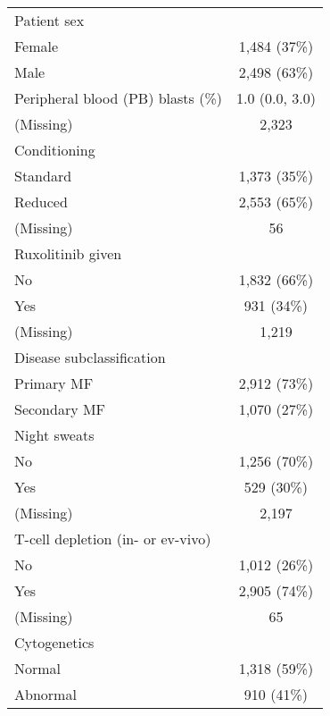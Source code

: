 \documentclass[
  12pt,
  a4paper,
]{article}
\begin{document}
\begin{longtable}[t]{lc}
Patient sex & \\
\hspace{1em}Female & 1,484 (37\%)\\
\hspace{1em}Male & 2,498 (63\%)\\
Peripheral blood (PB) blasts (\%) & 1.0 (0.0, 3.0)\\
\hspace{1em}(Missing) & 2,323\\
Conditioning & \\
\hspace{1em}Standard & 1,373 (35\%)\\
\hspace{1em}Reduced & 2,553 (65\%)\\
\hspace{1em}(Missing) & 56\\
Ruxolitinib given & \\
\hspace{1em}No & 1,832 (66\%)\\
\hspace{1em}Yes & 931 (34\%)\\
\hspace{1em}(Missing) & 1,219\\
Disease subclassification & \\
\hspace{1em}Primary MF & 2,912 (73\%)\\
\hspace{1em}Secondary MF & 1,070 (27\%)\\
Night sweats & \\
\hspace{1em}No & 1,256 (70\%)\\
\hspace{1em}Yes & 529 (30\%)\\
\hspace{1em}(Missing) & 2,197\\
T-cell depletion (in- or ev-vivo) & \\
\hspace{1em}No & 1,012 (26\%)\\
\hspace{1em}Yes & 2,905 (74\%)\\
\hspace{1em}(Missing) & 65\\
Cytogenetics & \\
\hspace{1em}Normal & 1,318 (59\%)\\
\hspace{1em}Abnormal & 910 (41\%)\\

\end{longtable}
\end{document}
